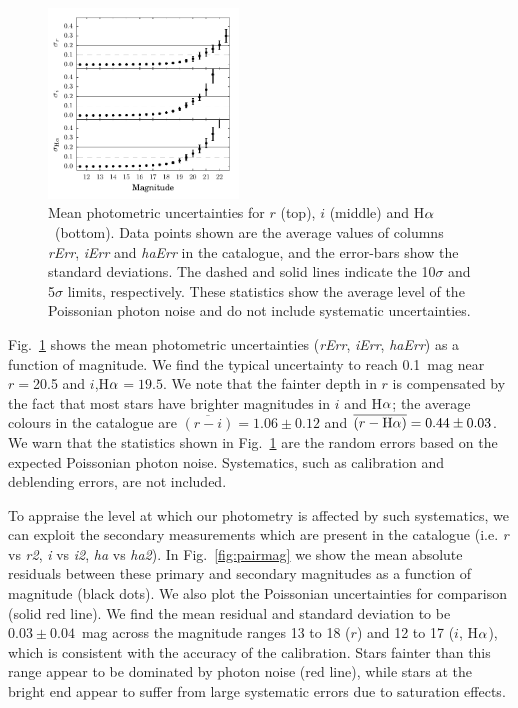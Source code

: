\documentclass[a4paper,useAMS,usenatbib]{mn2e}
\def\ha{\mbox{H$\rm \alpha$}}
\begin{document}
\begin{figure}
    \includegraphics[width=0.45\textwidth]{figures/uncertainties/uncertainties.pdf} 
    \caption{Mean photometric uncertainties
             for $r$ (top), $i$ (middle) and \ha\ (bottom).
             Data points shown are the average values of
             columns \emph{rErr}, \emph{iErr} and \emph{haErr}
             in the catalogue,
             and the error-bars show the standard deviations.
             The dashed and solid lines indicate 
             the 10$\sigma$ and 5$\sigma$ limits, respectively.
             These statistics show the average level of the Poissonian
             photon noise and do not include systematic uncertainties.}
    \label{fig:uncertainties}
\end{figure}

Fig.~\ref{fig:uncertainties} shows the mean photometric
uncertainties (\emph{rErr}, \emph{iErr}, \emph{haErr})
as a function of magnitude.
We find the typical uncertainty to reach 0.1~mag near $r=$20.5 
and $i$,\ha$=19.5$.
We note that the fainter depth in $r$ is compensated
by the fact that most stars have brighter magnitudes in $i$ and \ha;
the average colours in the catalogue are
$\overline{(r-i)}=1.06\pm0.12$ and $\overline{(r-\ha)}=0.44\pm0.03$.
We warn that the statistics shown in Fig.~\ref{fig:uncertainties}
are the random errors based on the expected Poissonian photon noise.
Systematics, such as calibration and deblending errors,
are not included.

To appraise the level at which our photometry is affected by such systematics,
we can exploit the secondary measurements which are present in the catalogue
(i.e. \emph{r} vs \emph{r2}, \emph{i} vs \emph{i2}, \emph{ha} vs \emph{ha2}).
In Fig.~\ref{fig:pairmag} we show the mean absolute residuals between
these primary and secondary magnitudes as a function of magnitude (black dots).
We also plot the Poissonian uncertainties for comparison (solid red line).
We find the mean residual and standard deviation to be $0.03\pm0.04$~mag
across the magnitude ranges 13 to 18 ($r$)
and 12 to 17 ($i$, \ha),
which is consistent with the accuracy of the calibration.
Stars fainter than this range appear to be dominated by photon noise (red line),
while stars at the bright end appear to suffer from large systematic
errors due to saturation effects.
\end{document}
